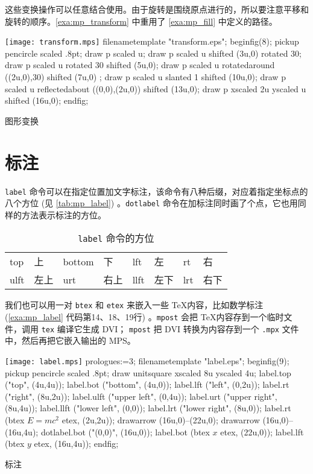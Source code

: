 这些变换操作可以任意结合使用。由于旋转是围绕原点进行的，所以要注意平移和旋转的顺序。\autoref{exa:mp_transform} 中重用了 \autoref{exa:mp_fill} 中定义的路径。

\begin{example}[htbp]
\begin{FBTDemo}[numbers=left]{\texttt{[image: transform.mps]}}
filenametemplate "transform.eps";
beginfig(8);
pickup pencircle scaled .8pt;
draw p scaled u;
draw p scaled u shifted (3u,0) rotated 30;
draw p scaled u rotated 30 shifted (5u,0);
draw p scaled u rotatedaround ((2u,0),30) shifted (7u,0) ;
draw p scaled u slanted 1 shifted (10u,0);
draw p scaled u reflectedabout ((0,0),(2u,0)) 
  shifted (13u,0);
draw p xscaled 2u yscaled u shifted (16u,0);
endfig;
\end{FBTDemo}
\caption{\MP 图形变换}
\label{exa:mp_transform}
\end{example}

\section{标注}

 \texttt{label} 命令可以在指定位置加文字标注，该命令有八种后缀，对应着指定坐标点的八个方位 (见 \autoref{tab:mp_label}) 。\texttt{dotlabel} 命令在加标注同时画了个点，它也用同样的方法表示标注的方位。

\begin{table}[htbp]
\centering
\caption{ \texttt{label} 命令的方位}
\label{tab:mp_label}
\begin{tabular}{llllllll}
  \toprule
  top  & 上   & bottom & 下   & lft  & 左   & rt  & 右 \\
  ulft & 左上 & urt    & 右上 & llft & 左下 & lrt & 右下 \\
  \bottomrule
\end{tabular}
\end{table}

我们也可以用一对 \texttt{btex} 和 \texttt{etex} 来嵌入一些 \TeX 内容，比如数学标注 (\autoref{exa:mp_label} 代码第14、18、19行) 。\texttt{mpost} 会把 \TeX 内容存到一个临时文件，调用 \texttt{tex} 编译它生成 DVI； \texttt{mpost} 把 DVI 转换为\MP 内容存到一个 \texttt{.mpx} 文件中，然后再把它嵌入输出的 MPS。

\begin{example}[htbp]
\begin{FBTDemo}[numbers=left]{\texttt{[image: label.mps]}}
prologues:=3;
filenametemplate "label.eps";
beginfig(9);
pickup pencircle scaled .8pt;
draw unitsquare xscaled 8u yscaled 4u;
label.top ("top", (4u,4u));
label.bot ("bottom", (4u,0));
label.lft ("left", (0,2u));
label.rt ("right", (8u,2u));
label.ulft ("upper left", (0,4u));
label.urt ("upper right", (8u,4u));
label.llft ("lower left", (0,0));
label.lrt ("lower right", (8u,0));
label.rt (btex $E=mc^2$ etex, (2u,2u));
drawarrow (16u,0)--(22u,0);
drawarrow (16u,0)--(16u,4u);
dotlabel.bot ("(0,0)", (16u,0));
label.bot (btex $x$ etex, (22u,0));
label.lft (btex $y$ etex, (16u,4u));
endfig;
\end{FBTDemo}
\caption{\MP 标注}
\label{exa:mp_label}
\end{example}

